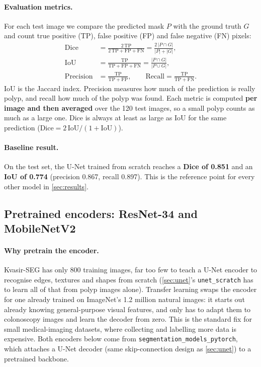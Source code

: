\paragraph{Evaluation metrics.}
For each test image we compare the predicted mask $P$ with the ground truth $G$ and count true positive
(TP), false positive (FP) and false negative (FN) pixels:
\begin{align}
  \mathrm{Dice} &= \frac{2\,\mathrm{TP}}{2\,\mathrm{TP} + \mathrm{FP} + \mathrm{FN}} = \frac{2\,|P \cap G|}{|P| + |G|}, \label{eq:dice}\\
  \mathrm{IoU}  &= \frac{\mathrm{TP}}{\mathrm{TP} + \mathrm{FP} + \mathrm{FN}} = \frac{|P \cap G|}{|P \cup G|}, \label{eq:iou}\\
  \mathrm{Precision} &= \frac{\mathrm{TP}}{\mathrm{TP} + \mathrm{FP}}, \qquad
  \mathrm{Recall} = \frac{\mathrm{TP}}{\mathrm{TP} + \mathrm{FN}}.
\end{align}
IoU is the Jaccard index. Precision measures how much of the prediction is really polyp, and recall how much of the polyp was found.
Each metric is computed \textbf{per image and then averaged} over the 120 test images, so a small polyp counts as
much as a large one. Dice is always at least as large as IoU for the same prediction
($\mathrm{Dice} = 2\,\mathrm{IoU} / (1 + \mathrm{IoU})$).

\paragraph{Baseline result.} On the test set, the U-Net trained from scratch reaches a \textbf{Dice of 0.851} and an
\textbf{IoU of 0.774} (precision 0.867, recall 0.897). This is the reference point for every other model in \cref{sec:results}.

\subsection{Pretrained encoders: ResNet-34 and MobileNetV2}
\label{sec:pretrained}

\paragraph{Why pretrain the encoder.}
Kvasir-SEG has only 800 training images, far too few to teach a U-Net encoder to recognise edges,
textures and shapes from scratch (\cref{sec:unet}'s \texttt{unet\_scratch} has to learn all of that from polyp images
alone). Transfer learning swaps the encoder for one already trained on ImageNet's 1.2 million natural
images: it starts out already knowing general-purpose visual features, and only has to adapt them to
colonoscopy images and learn the decoder from zero. This is the standard fix for small medical-imaging
datasets, where collecting and labelling more data is expensive. Both encoders below come from
\texttt{segmentation\_models\_pytorch}, which attaches a U-Net decoder (same skip-connection design as \cref{sec:unet})
to a pretrained backbone.

